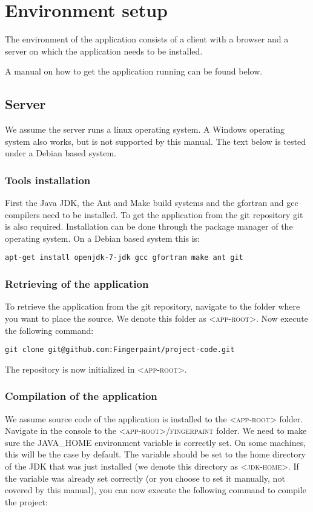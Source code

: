 \chapter{Environment setup}
\label{environment_setup}
The environment of the \applicationname{} application consists of a client with a browser and a server on which the application needs to be installed.

A manual on how to get the \applicationname{} application running can be found below.

\section{Server}
We assume the server runs a linux operating system. A Windows operating system also works, but is not supported by this manual. The text below is tested under a Debian based system.

\subsection{Tools installation}
First the Java JDK, the Ant and Make build systems and the gfortran and gcc compilers need to be installed. To get the application from the git repository git is also required. Installation can be done through the package manager of the operating system. On a Debian based system this is:

\begin{verbatim}
apt-get install openjdk-7-jdk gcc gfortran make ant git
\end{verbatim}

\subsection{Retrieving of the application}
To retrieve the application from the git repository, navigate to the folder where you want to place the source.
We denote this folder as \textsc{<app-root>}. Now execute the following command:

\begin{verbatim}
git clone git@github.com:Fingerpaint/project-code.git
\end{verbatim}

The repository is now initialized in \textsc{<app-root>}.

\subsection{Compilation of the application}
We assume source code of the application is installed to the \textsc{<app-root>} folder.
Navigate in the console to the \textsc{<app-root>/fingerpaint} folder. 
We need to make sure the \textsc{JAVA_HOME} environment variable is correctly set. On some machines, this will
be the case by default. The variable should be set to the home directory of the JDK that was just installed (we denote this directory as \textsc{<jdk-home>}. If the variable was already set correctly (or you choose to set it manually, not covered by this manual), you can now execute the following command to compile the project:

